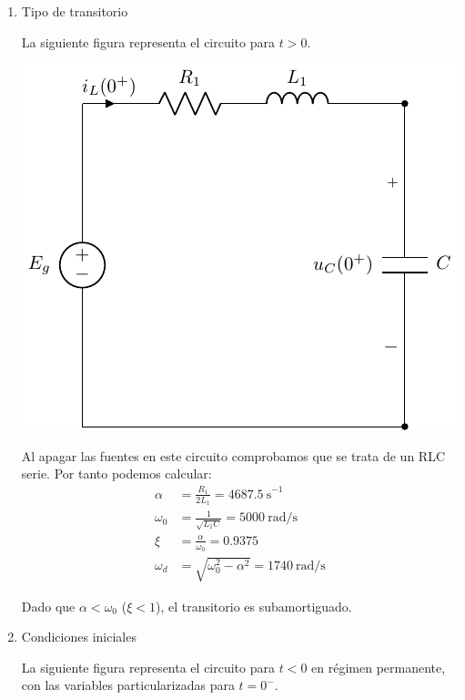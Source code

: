 \begin{enumerate}

\item Tipo de transitorio

La siguiente figura representa el circuito para $t > 0$.

\includegraphics{figuras/E1_RLC_0+.pdf}

Al apagar las fuentes en este circuito comprobamos que se trata de un RLC serie. Por tanto podemos calcular:
\begin{align*}
  \alpha &= \frac{R_1}{2L_1} = \SI{4687.5}{\second}^{-1}\\[3pt]
  \omega_0 &= \frac{1}{\sqrt{L_1C}} = \SI{5000}{\radian\per\second}\\[3pt]
  \xi &= \frac{\alpha}{\omega_0} = 0.9375\\[3pt]
  \omega_d &= \sqrt{\omega_0^2 - \alpha^2} = \SI{1740}{\radian\per\second}
\end{align*}

\vspace{1mm}
Dado que $\alpha < \omega_0$ ($\xi < 1$), el transitorio es subamortiguado.

\vspace{2mm}

\item Condiciones iniciales

  La siguiente figura representa el circuito para $t < 0$ en régimen permanente, con las variables particularizadas para $t = 0^-$.


\end{enumerate}

